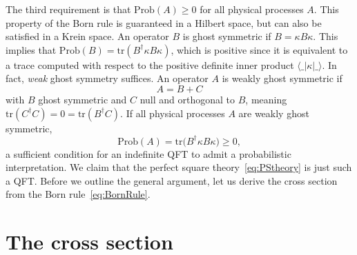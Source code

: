 \documentclass[pra,aps,amsmath,amssymb,notitlepage, twocolumn,superscriptaddress,longbibliography,nofootinbib,floatfix,10pt]{revtex4-2}
\begin{document}
The third requirement is that $\text{Prob}(A)\ge0$ for all physical processes $A$. This property of the Born rule is guaranteed in a Hilbert space, but can also be satisfied in a Krein space.  An operator $B$ is ghost symmetric if $B=\kappa B \kappa$. This implies  that $\text{Prob}(B)=\text{tr}(B^\dagger\kappa B\kappa)$, which is positive since it is equivalent to a trace computed with respect to the positive definite inner product $\langle\_|\kappa|\_\rangle$. In fact, {\it weak} ghost symmetry suffices. An operator $A$ is weakly ghost symmetric if
\begin{equation}\label{eq:weak_decomposition}
    A = B + C
\end{equation}
with $B$ ghost symmetric and $C$ null and orthogonal to $B$, meaning $\text{tr}(C^\dagger C)=0=\text{tr}(B^\dagger C)$. If all physical processes $A$ are weakly ghost symmetric,
\begin{equation}
    \text{Prob}(A) = \text{tr}\bigl(B^\dagger \kappa B \kappa \bigr) \ge 0,
\end{equation}
a sufficient condition for an indefinite QFT to admit a probabilistic interpretation. We claim that the perfect square theory~\eqref{eq:PStheory} is just such a QFT. Before we outline the general argument, let us derive the cross section from the Born rule~\eqref{eq:BornRule}.

\section{The cross section}
\end{document}
